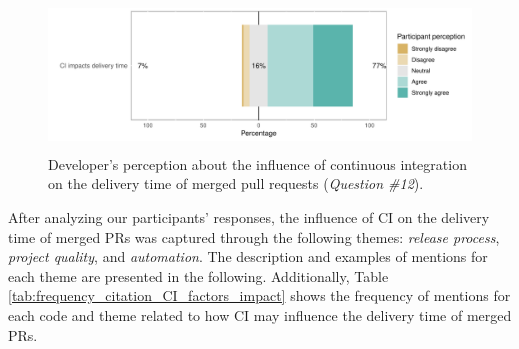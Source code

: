 \begin{figure}[h!]
	\includegraphics[height=4cm, width=12cm]{developers_accordance_on_the_impact_of_ci_on_delivery_time.pdf}
	\caption{Developer's perception about the influence of continuous integration on the delivery time of merged pull requests (\textit{Question \#12}).}
	\label{fig:developer_perception_about_impact_of_ci_on_delivery_time}       %
\end{figure}

After analyzing our participants' responses, the influence of CI on the delivery time of merged PRs was captured through the following themes: \textit{release process}, \textit{project quality}, and \textit{automation}. The description and examples of mentions for each theme are presented in the following. Additionally, Table \ref{tab:frequency_citation_CI_factors_impact} shows the frequency of mentions for each code and theme related to how CI may influence the delivery time of merged PRs. 

